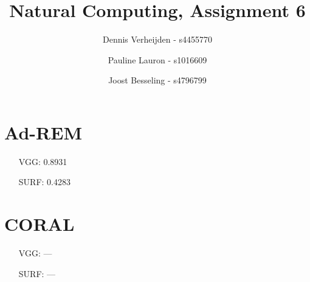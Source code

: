 \documentclass[11pt]{article}
\title{Natural Computing, Assignment 6}
\author{Dennis Verheijden - s4455770 \and Pauline Lauron - s1016609 \and Joost Besseling - s4796799}
\begin{document}
\maketitle

\section*{Ad-REM}
\begin{itemize}
	\item[VGG:] 0.8931
	\item[SURF:] 0.4283
\end{itemize}


\section*{CORAL}
\begin{itemize}
	\item[VGG:] ---
	\item[SURF:] ---
\end{itemize}
\end{document}
